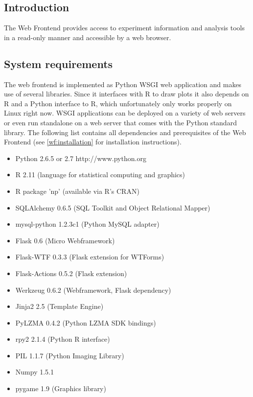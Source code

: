 \upshape
{}
\subsection{Introduction}
The Web Frontend provides access to experiment information and analysis tools in a read-only manner
and accessible by a web browser.

\subsection{System requirements}
\label{wfSR}
The web frontend is implemented as Python WSGI web application and makes use of several libraries.
Since it interfaces with R to draw plots it also depends on R and a Python interface to R, which unfortunately
only works properly on Linux right now.
WSGI applications can be deployed on a variety of web servers or even run standalone on a web server that comes with the
Python standard library.
The following list contains all dependencies and prerequisites of the Web Frontend (see \ref{wf:installation} for installation instructions).
\begin{itemize}
\item Python 2.6.5 or 2.7 http://www.python.org
\item R 2.11 (language for statistical computing and graphics)
\item R package 'np' (available via R's CRAN)
\item SQLAlchemy 0.6.5 (SQL Toolkit and Object Relational Mapper)
\item mysql-python 1.2.3c1 (Python MySQL adapter)
\item Flask 0.6 (Micro Webframework)
\item Flask-WTF 0.3.3 (Flask extension for WTForms)
\item Flask-Actions 0.5.2 (Flask extension)
\item Werkzeug 0.6.2 (Webframework, Flask dependency)
\item Jinja2 2.5 (Template Engine)
\item PyLZMA 0.4.2 (Python LZMA SDK bindings)
\item rpy2 2.1.4 (Python R interface)
\item PIL 1.1.7 (Python Imaging Library)
\item Numpy 1.5.1
\item pygame 1.9 (Graphics library)
\end{itemize}

